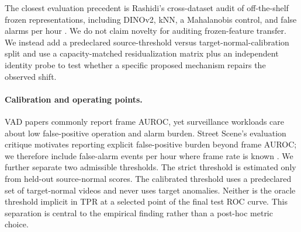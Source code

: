 The closest evaluation precedent is Rashidi's cross-dataset audit of off-the-shelf frozen representations, including DINOv2, kNN, a Mahalanobis control, and false alarms per hour \citep{rashidi2026benchmark}. We do not claim novelty for auditing frozen-feature transfer. We instead add a predeclared source-threshold versus target-normal-calibration split and use a capacity-matched residualization matrix plus an independent identity probe to test whether a specific proposed mechanism repairs the observed shift.

\paragraph{Calibration and operating points.}
VAD papers commonly report frame AUROC, yet surveillance workloads care about low false-positive operation and alarm burden. Street Scene's evaluation critique motivates reporting explicit false-positive burden beyond frame AUROC; we therefore include false-alarm events per hour where frame rate is known \citep{ramachandra2020street}. We further separate two admissible thresholds. The strict threshold is estimated only from held-out source-normal scores. The calibrated threshold uses a predeclared set of target-normal videos and never uses target anomalies. Neither is the oracle threshold implicit in TPR at a selected point of the final test ROC curve. This separation is central to the empirical finding rather than a post-hoc metric choice.
